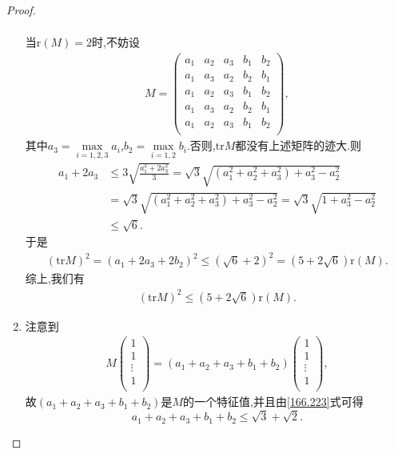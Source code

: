 \documentclass[../../main.tex]{subfiles}
\begin{document}
\begin{proof}
\begin{enumerate}[(1)]
\begin{align*}
\end{align*}
当$\mathrm{r}\left( M \right) =2$时,不妨设
\begin{align*}
M=\begin{pmatrix}
a_1&	a_2&	a_3&	b_1&	b_2\\
a_1&	a_3&	a_2&	b_2&	b_1\\
a_1&	a_2&	a_3&	b_1&	b_2\\
a_1&	a_3&	a_2&	b_2&	b_1\\
a_1&	a_2&	a_3&	b_1&	b_2\\
\end{pmatrix},
\end{align*}
其中$a_3=\max\limits_{i=1,2,3}a_i$,$b_2=\max\limits_{i=1,2}b_i$.否则,$\mathrm{tr}M$都没有上述矩阵的迹大.则
\begin{align*}
a_1+2a_3&\leqslant 3\sqrt{\frac{a_{1}^{2}+2a_{3}^{2}}{3}}=\sqrt{3}\sqrt{\left( a_{1}^{2}+a_{2}^{2}+a_{3}^{2} \right) +a_{3}^{2}-a_{2}^{2}}\\
&=\sqrt{3}\sqrt{\left( a_{1}^{2}+a_{2}^{2}+a_{3}^{2} \right) +a_{3}^{2}-a_{2}^{2}}=\sqrt{3}\sqrt{1+a_{3}^{2}-a_{2}^{2}}\\
&\leqslant \sqrt{6}.
\end{align*}
于是
\begin{align*}
\left( \mathrm{tr}M \right) ^2=\left( a_1+2a_3+2b_2 \right) ^2\leqslant \left( \sqrt{6}+2 \right) ^2=\left( 5+2\sqrt{6} \right) \mathrm{r}\left( M \right).
\end{align*}
综上,我们有
\begin{align*}
\left( \mathrm{tr}M \right) ^2\leqslant \left( 5+2\sqrt{6} \right) \mathrm{r}\left( M \right).
\end{align*}

\item 注意到
\begin{align*}
M\left( \begin{array}{c}
1\\
1\\
\vdots\\
1\\
\end{array} \right) =\left( a_1+a_2+a_3+b_1+b_2 \right) \left( \begin{array}{c}
1\\
1\\
\vdots\\
1\\
\end{array} \right) ,
\end{align*}
故$\left( a_1+a_2+a_3+b_1+b_2 \right)$是$M$的一个特征值,并且由\eqref{166.223}式可得$$a_1+a_2+a_3+b_1+b_2\leqslant \sqrt{3}+\sqrt{2}.$$
\end{enumerate}

\end{proof}
\end{document}

